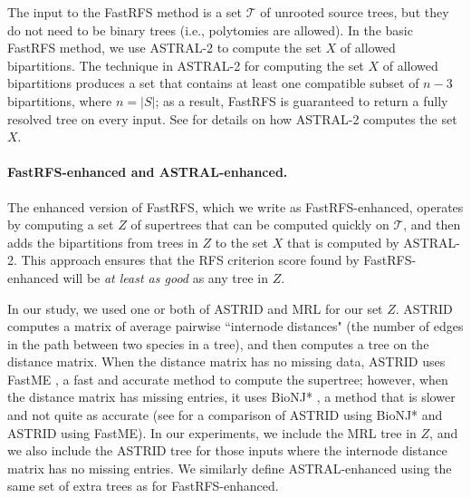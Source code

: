 The input to the FastRFS method is a set $\mathcal{T}$ of unrooted source trees,
but they do not need to be binary trees (i.e., 
polytomies are allowed).   
In the basic FastRFS method, we use ASTRAL-2 to compute the set
$X$ of allowed bipartitions.
The technique in ASTRAL-2
for computing the set $X$ of allowed bipartitions 
produces a set that contains at least one compatible subset of $n-3$ bipartitions,
where $n=|S|$; as a result,
FastRFS is guaranteed to return a fully resolved tree on every input.
See \cite{MirarabPhD} for details on how ASTRAL-2 computes the set $X$.





\paragraph{\bf FastRFS-enhanced and ASTRAL-enhanced.  }
The enhanced version of FastRFS, which we write as
FastRFS-enhanced,  operates by computing a set
$Z$ of supertrees that can be computed quickly on $\mathcal{T}$, 
and then adds the bipartitions from trees in $Z$ to the set $X$
that is computed by ASTRAL-2.
This approach ensures that the RFS criterion score
found by FastRFS-enhanced will be {\em at least as good} as any tree in $Z$.

In our study, we used one or both of ASTRID and MRL for our set $Z$.
ASTRID computes a matrix of average pairwise ``internode distances"
(the number of edges in the path between two species in a tree),
and then computes a tree on the distance matrix.
When the distance matrix has no missing data,
ASTRID uses FastME \cite{Desper2002}, a fast
and accurate method to 
compute the supertree; however, when the 
distance matrix has missing entries, it
uses BioNJ* \cite{phydstar},
a method that is slower and not quite as accurate
(see \cite{ASTRID} for a comparison of ASTRID using 
BioNJ* and ASTRID using FastME).
In our experiments, we 
include the MRL tree in $Z$, and we also 
include the ASTRID tree for those inputs
where the internode distance matrix has no missing entries.
We similarly define ASTRAL-enhanced using the same
set of extra trees as for FastRFS-enhanced.






